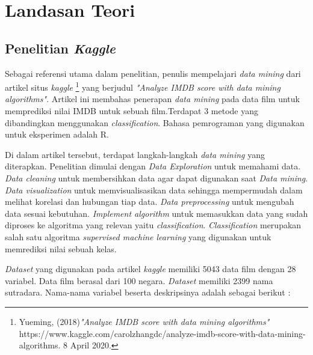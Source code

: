\chapter{Landasan Teori}
\label{chap:teori}


\section{Penelitian \textit{Kaggle}}
Sebagai referensi utama dalam penelitian, penulis mempelajari \textit{data mining} dari artikel situs \textit{kaggle} \footnote{Yueming, (2018)\textit{"Analyze IMDB score with data mining algorithms"} https://www.kaggle.com/carolzhangdc/analyze-imdb-score-with-data-mining-algorithms. 8 April 2020.} yang berjudul \textit{"Analyze IMDB score with data mining algorithms"}. Artikel ini membahas penerapan \textit{data mining} pada data film  untuk memprediksi nilai IMDB untuk sebuah film.Terdapat 3 metode yang dibandingkan menggunakan \textit{classification}. Bahasa pemrograman yang digunakan untuk eksperimen adalah R.

Di dalam artikel tersebut, terdapat langkah-langkah \textit{data mining} yang diterapkan. Penelitian dimulai dengan \textit{Data Exploration} untuk memahami data. \textit{Data cleaning} untuk membersihkan data agar dapat digunakan saat \textit{Data mining}. \textit{Data visualization} untuk memvisualisasikan data sehingga mempermudah dalam melihat korelasi dan hubungan tiap data. \textit{Data preprocessing} untuk mengubah data sesuai kebutuhan. \textit{Implement algorithm} untuk memasukkan data yang sudah diproses ke algoritma yang relevan yaitu \textit{classification}. \textit{Classification} merupakan salah satu algoritma \textit{supervised machine learning} yang digunakan untuk memrediksi nilai sebuah kelas.

\textit{Dataset} yang digunakan pada artikel \textit{kaggle} memiliki 5043 data film dengan 28 variabel. Data film berasal dari 100 negara. \textit{Dataset} memiliki 2399 nama sutradara. Nama-nama variabel beserta deskripsinya adalah sebagai berikut :


